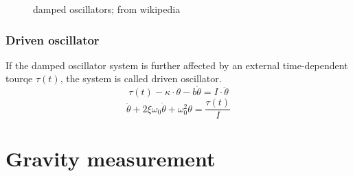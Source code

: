 \documentclass[\main/master.tex]{subfiles}
\begin{document}
\begin{figure}[htbp]
	\centering
	\caption[damped]{damped oscillators; from wikipedia}
	\label{fig:damped_oscillators}
\end{figure}





\iffalse
https://ocw.mit.edu/courses/mathematics/18-03sc-differential-equations-fall-2011/unit-ii-second-order-constant-coefficient-linear-equations/damped-harmonic-oscillators/MIT18_03SCF11_s13_2text.pdf

https://www.sciencedirect.com/topics/engineering/underdamped-system#:~:text=When%
\fi

\subsubsection{Driven oscillator}
If the damped oscillator system is further affected by an external time-dependent tourqe $\tau(t)$,  the system is called driven oscillator.
\begin{equation}
\tau(t) -\kappa\cdot\theta - b\dot{\theta}  = I\cdot\ddot{\theta}   \label{eqn:driven_motion_equation}
\end{equation} 
\begin{equation}
\ddot{\theta} + 2\xi\omega_0\dot{\theta} + \omega_0^2\theta = \frac{\tau(t)}{I}   \label{eqn:damped_motion_equation}
\end{equation}






\section{Gravity measurement}
\end{document}

